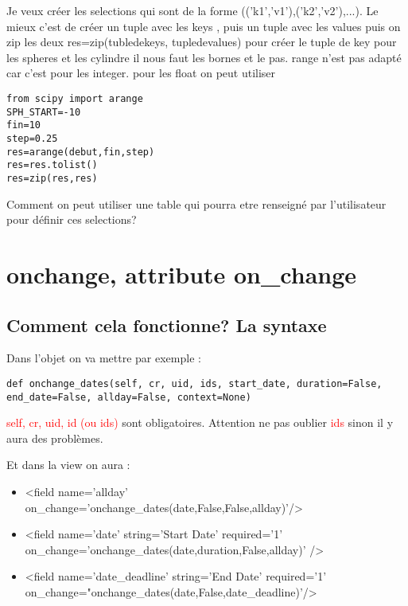 \documentclass[12pt,a4paper]{article}
\begin{document}
Je veux créer les selections qui sont de la forme (('k1','v1'),('k2','v2'),...). 
Le mieux c'est de créer un tuple avec les keys , puis un tuple avec les values 
puis on zip les deux res=zip(tubledekeys, tupledevalues)
pour créer le tuple de key pour les spheres et les cylindre il nous faut les bornes et le pas. 
range n'est pas adapté car c'est pour les integer. 
pour les float on peut utiliser
\begin{verbatim}
from scipy import arange
SPH_START=-10
fin=10
step=0.25
res=arange(debut,fin,step)
res=res.tolist()
res=zip(res,res)

\end{verbatim}

Comment on peut utiliser une table qui pourra etre renseigné par l'utilisateur pour définir ces selections?


\section{ onchange, attribute on\_change}
\label{sec:onchange}

\subsection{Comment cela fonctionne? La syntaxe}
\label{sec:syntax_onchange}

Dans l’objet on va mettre par exemple :

\begin{verbatim}
def onchange_dates(self, cr, uid, ids, start_date, duration=False, end_date=False, allday=False, context=None)
\end{verbatim}

 \textcolor{red}{self, cr, uid, id (ou ids)} sont obligatoires. Attention ne pas oublier  \textcolor{red}{ids} sinon il y aura des problèmes.

Et dans la view on aura :

\begin{itemize}
\item  <field name='allday' on\_change='onchange\_dates(date,False,False,allday)'/>
\item  <field name='date' string='Start Date' required='1' on\_change='onchange\_dates(date,duration,False,allday)' />
\item  <field name='date\_deadline' string='End Date' required='1' on\_change="onchange\_dates(date,False,date\_deadline)'/>
\end{itemize}
\end{document}
